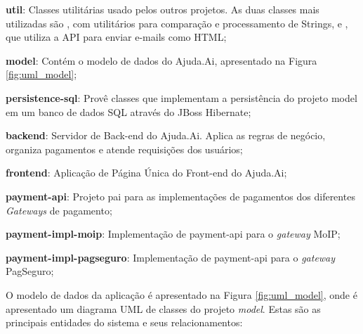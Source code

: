 \begin{lista}
  \item \textbf{util}: Classes utilitárias usado pelos outros projetos. As duas classes mais utilizadas são , com utilitários para comparação e processamento de Strings, e , que utiliza a API  para enviar e-mails como HTML;
  \item \textbf{model}: Contém o modelo de dados do Ajuda.Ai, apresentado na Figura \ref{fig:uml_model};
  \item \textbf{persistence-sql}: Provê classes que implementam a persistência do projeto model em um banco de dados SQL através do JBoss Hibernate;
  \item \textbf{backend}: Servidor de Back-end do Ajuda.Ai. Aplica as regras de negócio, organiza pagamentos e atende requisições dos usuários;
  \item \textbf{frontend}: Aplicação de Página Única do Front-end do Ajuda.Ai;
  \item \textbf{payment-api}: Projeto pai para as implementações de pagamentos dos diferentes \emph{Gateways} de pagamento;
  \item \textbf{payment-impl-moip}: Implementação de payment-api para o \emph{gateway} MoIP;
  \item \textbf{payment-impl-pagseguro}: Implementação de payment-api para o \emph{gateway} PagSeguro;
\end{lista}

O modelo de dados da aplicação é apresentado na Figura \ref{fig:uml_model}, onde é apresentado um diagrama UML de classes do projeto \emph{model}. Estas são as principais entidades do sistema e seus relacionamentos:

